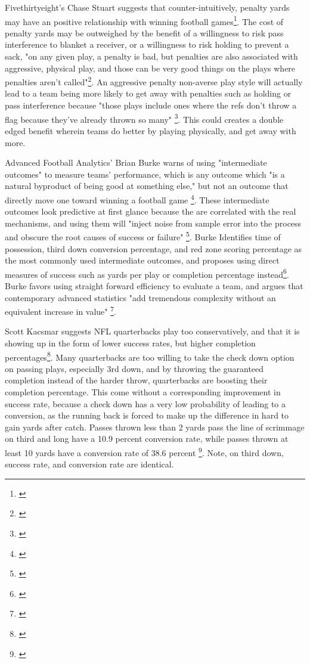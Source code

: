 \documentclass[12pt,english]{article}
\begin{document}
Fivethirtyeight's Chase Stuart suggests that counter-intuitively, penalty yards may have an positive relationship with winning football games\footnote{\citet{Stu16}}.  The cost of penalty yards may be outweighed by the benefit of a willingness to risk pass interference to blanket a receiver, or a willingness to risk holding to prevent a sack, "on any given play, a penalty is bad, but penalties are also associated with aggressive, physical play, and those can be very good things on the plays where penalties aren’t called"\footnote{\citet{Stu16}}.  An aggressive penalty non-averse play style will actually lead to a team being more likely to get away with penalties such as holding or pass interference because "those plays include ones where the refs don’t throw a flag because they’ve already thrown so many" \footnote{\citet{Stu16}}.  This could creates a double edged benefit wherein teams do better by playing physically, and get away with more.

Advanced Football Analytics' Brian Burke warns of using "intermediate outcomes" to measure teams' performance, which is any outcome which "is a natural byproduct of being good at something else," but not an outcome that directly move one toward winning a football game \footnote{\citet{Bur09}}.  These intermediate outcomes look predictive at first glance because the are correlated with the real mechanisms, and using them will "inject noise from sample error into the process and obscure the root causes of success or failure" \footnote{\citet{Bur09}}.  Burke Identifies time of possession, third down conversion percentage, and red zone scoring percentage as the most commonly used intermediate outcomes, and proposes using direct measures of success such as yards per play or completion percentage instead\footnote{\citet{Bur09}}.  Burke favors using straight forward efficiency to evaluate a team, and argues that contemporary advanced statistics "add tremendous complexity without an equivalent increase in value" \footnote{\citet{Bur09}}.

Scott Kacsmar suggests NFL quarterbacks play too conservatively, and that it is showing up in the form of lower success rates, but higher completion percentages\footnote{\citet{Kac17}}.  Many quarterbacks are too willing to take the check down option on passing plays, especially 3rd down, and by throwing the guaranteed completion instead of the harder throw, quarterbacks are boosting their completion percentage.  This come without a corresponding improvement in success rate, because a check down has a very low probability of leading to a conversion, as the running back is forced to make up the difference in hard to gain yards after catch.  Passes thrown less than 2 yards pass the line of scrimmage on third and long have a 10.9 percent conversion rate, while passes thrown at least 10 yards have a conversion rate of 38.6 percent \footnote{\citet{Kac17}}.  Note, on third down, success rate, and conversion rate are identical.
\end{document}
